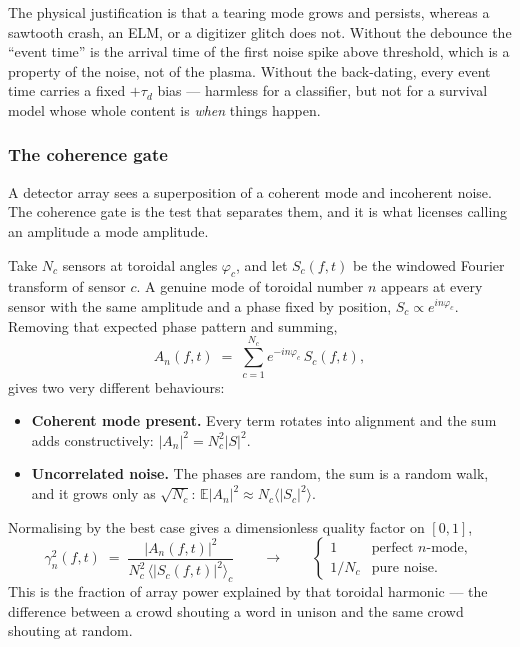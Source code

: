 \documentclass[11pt,a4paper]{article}
\begin{document}
The physical justification is that a tearing mode grows and persists, whereas a
sawtooth crash, an ELM, or a digitizer glitch does not. Without the debounce the
``event time'' is the arrival time of the first noise spike above threshold, which is a
property of the noise, not of the plasma. Without the back-dating, every event time
carries a fixed $+\tau_d$ bias --- harmless for a classifier, but not for a survival model
whose whole content is \emph{when} things happen.

\subsubsection{The coherence gate}

A detector array sees a superposition of a coherent mode and incoherent noise. The
coherence gate is the test that separates them, and it is what licenses calling an
amplitude a mode amplitude.

Take $N_c$ sensors at toroidal angles $\varphi_c$, and let $S_c(f,t)$ be the windowed
Fourier transform of sensor $c$. A genuine mode of toroidal number $n$ appears at every
sensor with the same amplitude and a phase fixed by position, $S_c \propto e^{i n \varphi_c}$.
Removing that expected phase pattern and summing,
\begin{equation}
A_n(f,t) \;=\; \sum_{c=1}^{N_c} e^{-i n \varphi_c}\, S_c(f,t),
\end{equation}
gives two very different behaviours:
\begin{itemize}[leftmargin=2em,noitemsep]
\item \textbf{Coherent mode present.} Every term rotates into alignment and the sum adds
constructively: $|A_n|^2 = N_c^2 |S|^2$.
\item \textbf{Uncorrelated noise.} The phases are random, the sum is a random walk, and it
grows only as $\sqrt{N_c}$: $\mathbb{E}|A_n|^2 \approx N_c \langle |S_c|^2\rangle$.
\end{itemize}
Normalising by the best case gives a dimensionless quality factor on $[0,1]$,
\begin{equation}
\gamma_n^2(f,t) \;=\; \frac{|A_n(f,t)|^2}{N_c^2\,\big\langle |S_c(f,t)|^2 \big\rangle_c}
\qquad\longrightarrow\qquad
\begin{cases}
1 & \text{perfect $n$-mode},\\[2pt]
1/N_c & \text{pure noise}.
\end{cases}
\label{eq:coh}
\end{equation}
This is the fraction of array power explained by that toroidal harmonic --- the difference
between a crowd shouting a word in unison and the same crowd shouting at random.
\end{document}
